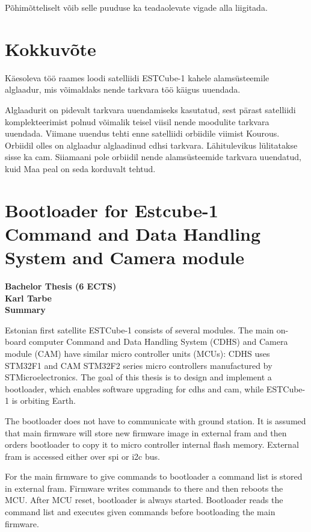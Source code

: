 \documentclass[12pt,a4paper]{article}
\begin{document}
Põhimõtteliselt võib selle puuduse ka teadaolevate vigade alla liigitada.

\section{Kokkuvõte}
Käesoleva töö raames loodi satelliidi ESTCube-1 kahele alamsüsteemile alglaadur,
mis võimaldaks nende tarkvara töö käigus uuendada. 

Alglaadurit on pidevalt tarkvara uuendamiseks kasutatud, sest pärast satelliidi
komplekteerimist polnud võimalik teisel viisil nende moodulite tarkvara
uuendada. Viimane uuendus tehti enne satelliidi orbiidile viimist Kourous.
Orbiidil olles on alglaadur alglaadinud \gls{cdhs}i tarkvara.  Lähitulevikus
lülitatakse sisse ka \gls{cam}. Siiamaani pole orbiidil nende alamsüsteemide
tarkvara uuendatud, kuid Maa peal on seda korduvalt tehtud. 


\section*{Bootloader for Estcube-1 Command and Data Handling System and Camera module}
\begin{center}
\bf Bachelor Thesis (6 ECTS)\\
Karl Tarbe\\
Summary
\end{center}
Estonian first satellite ESTCube-1 consists of several modules. The main
on-board computer Command and Data Handling System (CDHS) and Camera module
(CAM) have similar micro controller units (MCUs): CDHS uses STM32F1 and CAM STM32F2
series micro controllers manufactured by STMicroelectronics.  The goal of this
thesis is to design and implement a bootloader, which enables software upgrading
for \gls{cdhs} and \gls{cam}, while ESTCube-1 is orbiting Earth.

The bootloader does not have to communicate with ground station. It is assumed
that main firmware will store new firmware image in external \gls{fram} and then
orders bootloader to copy it to micro controller internal flash memory. External
\gls{fram} is accessed either over \gls{spi} or \gls{i2c} bus.

For the main firmware to give commands to bootloader a command list is stored in
external \gls{fram}. Firmware writes commands to there and then reboots the MCU.
After MCU reset, bootloader is always started. Bootloader reads the command
list and executes given commands before bootloading the main firmware.
\end{document}
